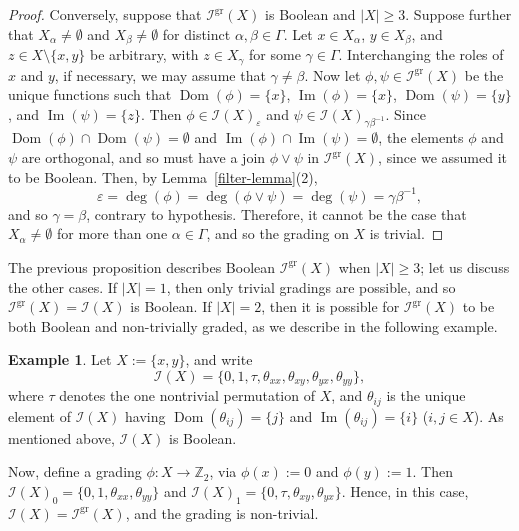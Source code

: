 \documentclass[a4paper,reqno,12pt]{amsart}
\numberwithin{equation}{section}
\theoremstyle{plain}
\theoremstyle{definition}
\newtheorem{example}[thm]{Example}
\newcommand{\im}{\operatorname{Im}}
\newcommand{\dom}{\operatorname{Dom}}
\newcommand{\gr}{\operatorname{gr}}
\def \Z{\mathbb Z}
\begin{document}
\begin{proof}
Conversely, suppose that $\mathcal{I}^{\gr}(X)$ is Boolean and $|X| \geq 3$. Suppose further that $X_{\alpha} \neq \emptyset$ and $X_{\beta} \neq \emptyset$ for distinct $\alpha, \beta \in \Gamma$. Let $x \in X_{\alpha}$, $y \in X_{\beta}$, and $z \in X\setminus \{x,y\}$ be arbitrary, with $z \in X_{\gamma}$ for some $\gamma \in \Gamma$. Interchanging the roles of $x$ and $y$, if necessary, we may assume that $\gamma \neq \beta$. Now let $\phi, \psi \in \mathcal{I}^{\gr}(X)$ be the unique functions such that $\dom(\phi) = \{x\}$, $\im(\phi) = \{x\}$, $\dom(\psi) = \{y\}$, and $\im(\psi) = \{z\}$. Then $\phi \in \mathcal{I}(X)_{\varepsilon}$ and $\psi \in \mathcal{I}(X)_{\gamma\beta^{-1}}$. Since $\dom(\phi) \cap \dom (\psi) = \emptyset$ and $\im(\phi) \cap \im (\psi) = \emptyset$, the elements $\phi$ and $\psi$ are orthogonal, and so must have a join $\phi \lor \psi$ in $\mathcal{I}^{\gr}(X)$, since we assumed it to be Boolean. Then, by Lemma~\ref{filter-lemma}(2),
\[\varepsilon = \deg(\phi) = \deg(\phi \lor \psi) = \deg(\psi) = \gamma\beta^{-1},\]
and so $\gamma = \beta$, contrary to hypothesis. Therefore, it cannot be the case that $X_{\alpha} \neq \emptyset$ for more than one $\alpha \in \Gamma$, and so the grading on $X$ is trivial.
\end{proof}

The previous proposition describes Boolean $\mathcal{I}^{\gr}(X)$ when $|X| \geq 3$; let us discuss the other cases. If $|X| = 1$, then only trivial gradings are possible, and so $\mathcal{I}^{\gr}(X) = \mathcal{I}(X)$ is Boolean. If $|X| = 2$, then it is possible for $\mathcal{I}^{\gr}(X)$ to be both Boolean and non-trivially graded, as we describe in the following example.

\begin{example} \label{symm-inv-eg}
Let $X := \{x,y\}$, and write 
\[\mathcal{I}(X) = \big\{0, 1, \tau, \theta_{xx}, \theta_{xy}, \theta_{yx}, \theta_{yy}\big\},\]
where $\tau$ denotes the one nontrivial permutation of $X$, and $\theta_{ij}$ is the unique element of $\mathcal{I}(X)$ having $\dom(\theta_{ij}) = \{j\}$ and $\im(\theta_{ij}) = \{i\}$ ($i,j \in X$). As mentioned above, $\mathcal{I}(X)$ is Boolean.

Now, define a grading $\phi : X \to \Z_2$, via $\phi(x) := 0$ and $\phi(y) := 1$. Then $\mathcal{I}(X)_0 = \{0, 1, \theta_{xx}, \theta_{yy}\}$ and $\mathcal{I}(X)_1 = \{0, \tau, \theta_{xy}, \theta_{yx}\}$. Hence, in this case, $\mathcal{I}(X) = \mathcal{I}^{\gr}(X)$, and the grading is non-trivial. 
\end{example}
\end{document}
